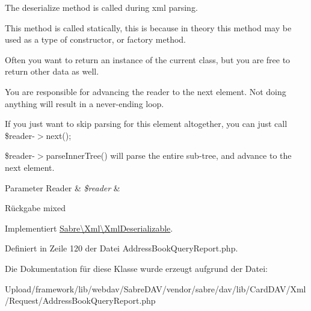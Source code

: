 The deserialize method is called during xml parsing.

This method is called statically, this is because in theory this method may be used as a type of constructor, or factory method.

Often you want to return an instance of the current class, but you are free to return other data as well.

You are responsible for advancing the reader to the next element. Not doing anything will result in a never-\/ending loop.

If you just want to skip parsing for this element altogether, you can just call \$reader-\/$>$next();

\$reader-\/$>$parse\+Inner\+Tree() will parse the entire sub-\/tree, and advance to the next element.


\begin{DoxyParams}[1]{Parameter}
Reader & {\em \$reader} & \\
\hline
\end{DoxyParams}
\begin{DoxyReturn}{Rückgabe}
mixed 
\end{DoxyReturn}


Implementiert \mbox{\hyperlink{interface_sabre_1_1_xml_1_1_xml_deserializable_a19e0eca545b9a0d93f7d6b69085ade30}{Sabre\textbackslash{}\+Xml\textbackslash{}\+Xml\+Deserializable}}.



Definiert in Zeile 120 der Datei Address\+Book\+Query\+Report.\+php.



Die Dokumentation für diese Klasse wurde erzeugt aufgrund der Datei\+:\begin{DoxyCompactItemize}
\item 
Upload/framework/lib/webdav/\+Sabre\+D\+A\+V/vendor/sabre/dav/lib/\+Card\+D\+A\+V/\+Xml/\+Request/Address\+Book\+Query\+Report.\+php\end{DoxyCompactItemize}

